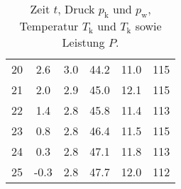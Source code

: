 \begin{table}[H]
\begin{tabular}[]{S[table-format=2.0] S S[table-format=1.1] S S S[table-format=3.0]}
       20 &  2.6  &  3.0 & 44.2  &  11.0  &  115 \\
       21 &  2.0  &  2.9 & 45.0  &  12.1  &  115 \\
       22 &  1.4  &  2.8 & 45.8  &  11.4  &  113 \\
       23 &  0.8  &  2.8 & 46.4  &  11.5  &  115 \\
       24 &  0.3  &  2.8 & 47.1  &  11.8  &  113 \\
       25 & -0.3  &  2.8 & 47.7  &  12.0  &  112 \\
    \bottomrule
    \end{tabular}
    \caption[]{Zeit $t$, Druck $p_\text{k}$ und $p_\text{w}$, Temperatur $T_\text{k}$ und $T_\text{k}$ sowie Leistung $P$.}
    \label{tab:messdaten}
\end{table}